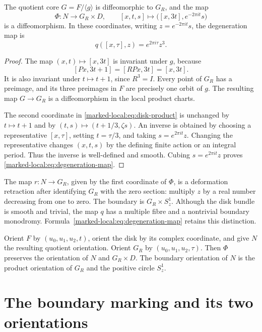 \begin{proposition}\label{marked-local:prop:disk-product}
The quotient core $G=F/\langle g\rangle$ is diffeomorphic to $G_R$,
and the map
\begin{equation}\label{marked-local:eq:disk-product}
 \Phi:N\longrightarrow G_R\times D,
 \qquad [x,t,s]\longmapsto\bigl([x,3t],e^{-2\pi it}s\bigr)
\end{equation}
is a diffeomorphism. In these coordinates, writing $z=e^{-2\pi it}s$,
the degeneration map is
\begin{equation}\label{marked-local:eq:degeneration-map}
                   q([x,\tau],z)=e^{2\pi i\tau}z^3.
\end{equation}
\end{proposition}
\begin{proof}
The map $(x,t)\mapsto[x,3t]$ is invariant under $g$, because
\[
 [Px,3t+1]=[RPx,3t]=[x,3t].
\]
It is also invariant under $t\mapsto t+1$, since $R^3=I$.
Every point of $G_R$ has a preimage, and its three preimages in $F$
are precisely one orbit of $g$. The resulting map $G\to G_R$
is a diffeomorphism in the local product charts.

The second coordinate in \eqref{marked-local:eq:disk-product} is unchanged by
$t\mapsto t+1$ and by $(t,s)\mapsto(t+1/3,\zeta s)$.
An inverse is obtained by choosing a representative $[x,\tau]$,
setting $t=\tau/3$, and taking $s=e^{2\pi it}z$.
Changing the representative changes $(x,t,s)$ by the defining finite
action or an integral period. Thus the inverse is well-defined and
smooth. Cubing $s=e^{2\pi it}z$ proves
\eqref{marked-local:eq:degeneration-map}.
\end{proof}

The map $r:N\to G_R$, given by the first coordinate of $\Phi$,
is a deformation retraction after identifying $G_R$ with the zero
section: multiply $z$ by a real number decreasing from one to zero.
The boundary is $G_R\times S^1_z$. Although the disk bundle is smooth
and trivial, the map $q$ has a multiple fibre and a nontrivial boundary
monodromy. Formula~\eqref{marked-local:eq:degeneration-map} retains this distinction.

Orient $F$ by $(u_0,u_1,u_2,t)$, orient the disk by its complex
coordinate, and give $N$ the resulting quotient orientation.
Orient $G_R$ by $(u_0,u_1,u_2,\tau)$. Then $\Phi$ preserves the
orientation of $N$ and $G_R\times D$. The boundary orientation of
$N$ is the product orientation of $G_R$ and the positive circle $S^1_z$.

\section{The boundary marking and its two orientations}

